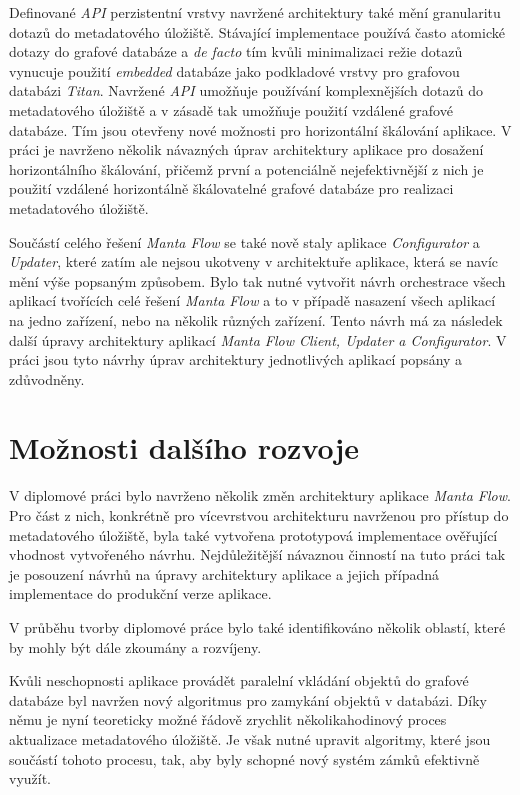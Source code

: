 Definované \textit{API} perzistentní vrstvy navržené architektury také mění granularitu dotazů do metadatového úložiště. Stávající implementace používá často atomické dotazy do grafové databáze a \textit{de facto} tím kvůli minimalizaci režie dotazů vynucuje použití \textit{embedded} databáze jako podkladové vrstvy pro grafovou databázi \textit{Titan}. Navržené \textit{API} umožňuje používání komplexnějších dotazů do metadatového úložiště a v zásadě tak umožňuje použití vzdálené grafové databáze. Tím jsou otevřeny nové možnosti pro horizontální škálování aplikace. V práci je navrženo několik návazných úprav architektury aplikace pro dosažení horizontálního škálování, přičemž první a potenciálně nejefektivnější z nich je použití vzdálené horizontálně škálovatelné grafové databáze pro realizaci metadatového úložiště.

Součástí celého řešení \textit{Manta Flow} se také nově staly aplikace \textit{Configurator} a \textit{Updater}, které zatím ale nejsou ukotveny v architektuře aplikace, která se navíc mění výše popsaným způsobem. Bylo tak nutné vytvořit návrh orchestrace všech aplikací tvořících celé řešení \textit{Manta Flow} a to v případě nasazení všech aplikací na jedno zařízení, nebo na několik různých zařízení. Tento návrh má za následek další úpravy architektury aplikací \textit{Manta Flow Client, Updater a Configurator}. V práci jsou tyto návrhy úprav architektury jednotlivých aplikací popsány a zdůvodněny.

\section{Možnosti dalšího rozvoje}

V diplomové práci bylo navrženo několik změn architektury aplikace \textit{Manta Flow}. Pro část z nich, konkrétně pro vícevrstvou architekturu navrženou pro přístup do metadatového úložiště, byla také vytvořena prototypová implementace ověřující vhodnost vytvořeného návrhu. Nejdůležitější návaznou činností na tuto práci tak je posouzení návrhů na úpravy architektury aplikace a jejich případná implementace do produkční verze aplikace.

V průběhu tvorby diplomové práce bylo také identifikováno několik oblastí, které by mohly být dále zkoumány a rozvíjeny.

Kvůli neschopnosti aplikace provádět paralelní vkládání objektů do grafové databáze byl navržen nový algoritmus pro zamykání objektů v databázi. Díky němu je nyní teoreticky možné řádově zrychlit několikahodinový proces aktualizace metadatového úložiště. Je však nutné upravit algoritmy, které jsou součástí tohoto procesu, tak, aby byly schopné nový systém zámků efektivně využít.

